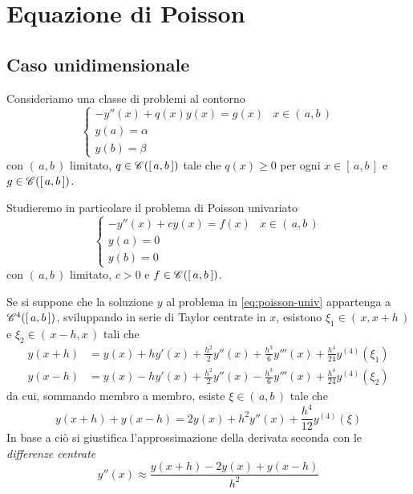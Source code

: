 \chapter{Equazione di Poisson}
	
\section{Caso unidimensionale}
		
	\noindent Consideriamo una classe di problemi al contorno
	\begin{equation}\label{eq:poisson-univ-gen}
		\begin{cases}
			-y'' (x) + q (x) y (x) = g (x) & x \in (\, a, b \,) \\
			y (a) = \alpha \\
			y (b) = \beta
		\end{cases}
	\end{equation}
	con \((\, a, b \,)\) limitato, \(q \in \mathscr{C} ([\, a, b \,])\) tale che \(q (x) \ge 0\) per ogni \(x \in [\, a, b \,]\) e \(g \in \mathscr{C} ([\, a, b \,])\).
	
	Studieremo in particolare il problema di Poisson univariato
	\begin{equation}\label{eq:poisson-univ}
		\begin{cases}
			-y'' (x) + c y (x) = f (x) & x \in (\, a, b \,) \\
			y (a) = 0 \\
			y (b) = 0
		\end{cases}
	\end{equation}
	con \((\, a, b \,)\) limitato, \(c > 0\) e \(f \in \mathscr{C} ([\, a, b \,])\).
	
	Se si suppone che la soluzione \(y\) al problema in \eqref{eq:poisson-univ} appartenga a \(\mathscr{C}^4 ([\, a, b \,])\), sviluppando in serie di Taylor centrate in \(x\), esistono \(\xi_1 \in (\, x, x + h \,)\) e \(\xi_2 \in (\, x - h, x \,)\) tali che
	\begin{align*}
		y (x + h) &= y (x) + h y' (x) + \frac{h^2}{2} y'' (x) + \frac{h^3}{6} y''' (x) + \frac{h^4}{24} y^{(4)} (\xi_1) \\
		y (x - h) &= y (x) - h y' (x) + \frac{h^2}{2} y'' (x) - \frac{h^3}{6} y''' (x) + \frac{h^4}{24} y^{(4)} (\xi_2)
	\end{align*}
	da cui, sommando membro a membro, esiste \(\xi \in (\, a, b \,)\) tale che
	\begin{equation*}
		y (x + h) + y (x - h) = 2 y (x) + h^2 y'' (x) + \frac{h^4}{12} y^{(4)} (\xi)
	\end{equation*}
	In base a ciò si giustifica l'approssimazione della derivata seconda con le \emph{differenze centrate}
	\begin{equation}\label{eq:poisson-diff-centr}
		y'' (x) \approx \frac{y (x + h) - 2 y (x) + y (x - h)}{h^2}
	\end{equation}

